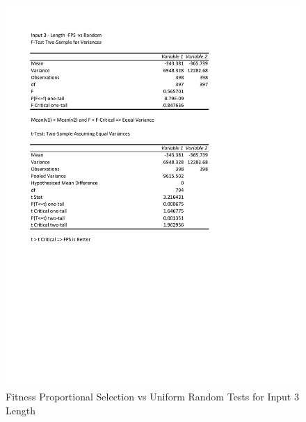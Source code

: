 \documentclass[times]{article}
\begin{document}
	\begin{figure}
		\caption{Fitness Proportional Selection vs Uniform Random Tests for Input 3 Length}
		\label{fig:3parent3}
		\includegraphics[width=\textwidth]{./t_test/3_parent3.pdf}
	\end{figure}
\end{document}
